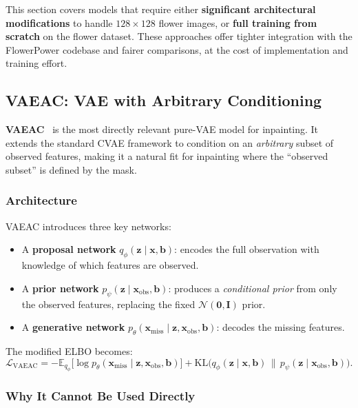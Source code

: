 \documentclass[11pt, a4paper]{article}
\newcommand{\loss}{\mathcal{L}}
\newcommand{\KL}{\mathrm{KL}}
\newcommand{\E}{\mathbb{E}}
\newcommand{\N}{\mathcal{N}}
\begin{document}
This section covers models that require either \textbf{significant architectural modifications} to handle \(128 \times 128\) flower images, or \textbf{full training from scratch} on the flower dataset. These approaches offer tighter integration with the FlowerPower codebase and fairer comparisons, at the cost of implementation and training effort.

\subsection{VAEAC: VAE with Arbitrary Conditioning}
\label{sec:vaeac}

\textbf{VAEAC}~\cite{ivanov2019vaeac} is the most directly relevant pure-VAE model for inpainting. It extends the standard CVAE framework to condition on an \textit{arbitrary} subset of observed features, making it a natural fit for inpainting where the ``observed subset'' is defined by the mask.

\subsubsection{Architecture}

VAEAC introduces three key networks:
\begin{itemize}[leftmargin=1.5em]
  \item A \textbf{proposal network} \(q_\phi(\mathbf{z} \mid \mathbf{x}, \mathbf{b})\): encodes the full observation with knowledge of which features are observed.
  \item A \textbf{prior network} \(p_\psi(\mathbf{z} \mid \mathbf{x}_{\text{obs}}, \mathbf{b})\): produces a \emph{conditional prior} from only the observed features, replacing the fixed \(\N(\mathbf{0}, \mathbf{I})\) prior.
  \item A \textbf{generative network} \(p_\theta(\mathbf{x}_{\text{miss}} \mid \mathbf{z}, \mathbf{x}_{\text{obs}}, \mathbf{b})\): decodes the missing features.
\end{itemize}

The modified ELBO becomes:
\begin{equation}
  \loss_{\text{VAEAC}} = -\E_{q_\phi}\!\big[\log p_\theta(\mathbf{x}_{\text{miss}} \mid \mathbf{z}, \mathbf{x}_{\text{obs}}, \mathbf{b})\big] + \KL\!\big(q_\phi(\mathbf{z} \mid \mathbf{x}, \mathbf{b}) \,\|\, p_\psi(\mathbf{z} \mid \mathbf{x}_{\text{obs}}, \mathbf{b})\big).
  \label{eq:vaeac_loss}
\end{equation}

\subsubsection{Why It Cannot Be Used Directly}
\end{document}
